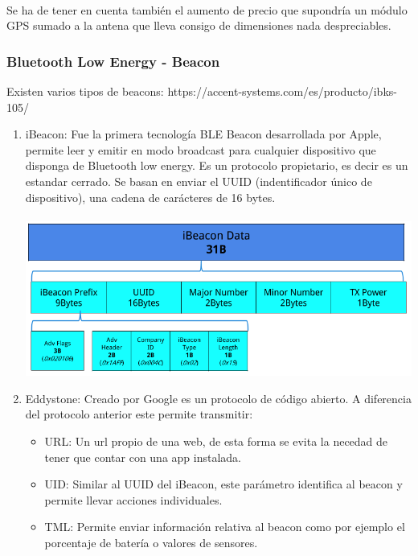 \documentclass[a4paper ,12pt, onecolumn]{article}
\begin{document}
        \paragraph{}
        Se ha de tener en cuenta también el aumento de precio que supondría un módulo GPS sumado a la antena que lleva consigo de 
        dimensiones nada despreciables.
        \subsubsection {Bluetooth Low Energy - Beacon}
        Existen varios tipos de beacons:
        https://accent-systems.com/es/producto/ibks-105/
        \begin{enumerate}
            \item iBeacon: Fue la primera tecnología BLE Beacon desarrollada por Apple, permite leer y emitir en modo 
            broadcast para cualquier dispositivo que disponga de Bluetooth low energy. Es un protocolo propietario, es 
            decir es un estandar cerrado. Se basan en enviar el UUID (indentificador único de dispositivo), una cadena de
            carácteres de 16 bytes.
            \paragraph{}
            \includegraphics[scale=0.5]{tipos_beacon_ibeacon.PNG}
            \item Eddystone: Creado por Google es un protocolo de código abierto. A diferencia del protocolo anterior este 
            permite transmitir:
            \begin{itemize}
                \item URL: Un url propio de una web, de esta forma se evita la necedad de tener que contar con una app instalada.
                \item UID: Similar al UUID del iBeacon, este parámetro identifica al beacon y permite llevar acciones individuales.
                \item TML: Permite enviar información relativa al beacon como por ejemplo el porcentaje de batería o valores de sensores.
            \end{itemize}

\end{enumerate}
\end{document}
